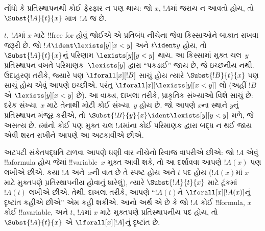 \documentclass[../../../include/open-logic-section]{subfiles}
\begin{document}
\begin{explain}
નોંધો કે પ્રતિસ્થાપનથી કોઈ ફેરફાર ન પણ થાય: જો $x$, $!A$માં
જરાય ન આવતો હોય, તો $\Subst{!A}{t}{x}$ માત્ર~$!A$ જ છે.

$t$, $!A$માં $x$ માટે !!{free for} હોવું જોઈએ એ પ્રતિબંધ નીચેના
જેવા કિસ્સાઓને બાકાત રાખવા જરૂરી છે. જો
$!A \ident \lexists[y][x < y]$ અને $t \ident y$ હોય, તો
$\Subst{!A}{t}{x}$નું પરિણામ $\lexists[y][y < y]$ થાય. આ કિસ્સામાં
મુક્ત ચલ~$y$ પ્રતિસ્થાપન વખતે પરિમાણક~$\lexists[y]$ દ્વારા
``પકડાઈ'' જાય છે, જે ઇચ્છનીય નથી. ઉદાહરણ તરીકે, જ્યારે પણ
$\lforall[x][!B]$ સાચું હોય ત્યારે $\Subst{!B}{t}{x}$ પણ સાચું હોય
એવું આપણે ઇચ્છીએ. પરંતુ $\lforall[x][\lexists[y][x < y]]$ લો
(અહીં $!B$ એ $\lexists[y][x < y]$ છે). આ વાક્ય, દાખલા તરીકે,
પ્રાકૃતિક સંખ્યાઓ વિશે સાચું છે: દરેક સંખ્યા~$x$ માટે તેનાથી મોટી
કોઈ સંખ્યા~$y$ હોય છે. જો આપણે $x$ના સ્થાને $y$નું પ્રતિસ્થાપન
મંજૂર કરીએ, તો $\Subst{!B}{y}{x} \ident \lexists[y][y < y]$ મળે,
જે અસત્ય છે. $t$માંનો કોઈ પણ મુક્ત ચલ $!A$માંના કોઈ પરિમાણક દ્વારા
બદ્ધ ન થઈ જાય એવી શરત રાખીને આપણે આ અટકાવીએ છીએ.
\end{explain}

અટપટી સંકેતપદ્ધતિ ટાળવા આપણે ઘણી વાર નીચેનો રિવાજ વાપરીએ છીએ: જો
$!A$ એવું !!a{formula} હોય જેમાં !!{variable}~$x$ મુક્ત આવી શકે, તો
આ દર્શાવવા આપણે $!A(x)$ પણ લખીએ છીએ. કયા $!A$ અને~$x$ની વાત છે તે
સ્પષ્ટ હોય અને $t$ પદ હોય ($!A(x)$માં $x$ માટે મુક્તપણે
પ્રતિસ્થાપનીય હોવાનું ધારેલું), ત્યારે $\Subst{!A}{t}{x}$ માટે ટૂંકમાં
$!A(t)$ લખીએ છીએ. તેથી, દાખલા તરીકે, આપણે ``$!A(t)$ને
$\lforall[x][!A(x)]$નું દૃષ્ટાંત
કહીએ છીએ'' એમ કહી શકીએ. આનો અર્થ એ છે કે જો $!A$ કોઈ !!{formula},
$x$ કોઈ !!a{variable}, અને $t$, $!A$માં $x$ માટે મુક્તપણે
પ્રતિસ્થાપનીય પદ હોય, તો $\Subst{!A}{t}{x}$ એ
$\lforall[x][!A]$નું દૃષ્ટાંત છે.
\end{document}
